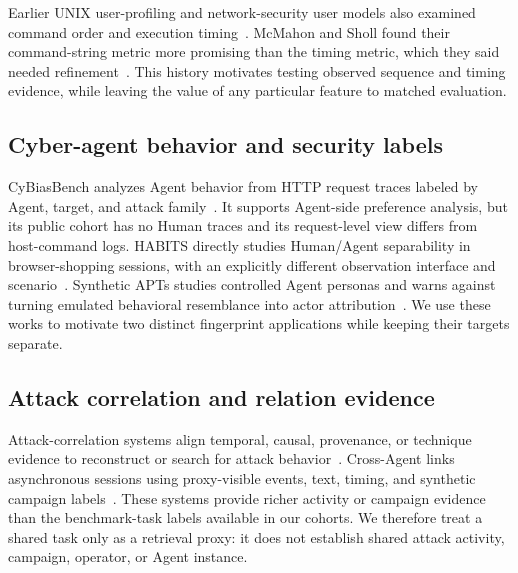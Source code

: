 \documentclass[10pt]{article}
\begin{document}
Earlier UNIX user-profiling and network-security user models also examined command order and execution timing~\cite{dao,mcmahon}. McMahon and Sholl found their command-string metric more promising than the timing metric, which they said needed refinement~\cite{mcmahon}. This history motivates testing observed sequence and timing evidence, while leaving the value of any particular feature to matched evaluation.

\subsection{Cyber-agent behavior and security labels}
CyBiasBench analyzes Agent behavior from HTTP request traces labeled by Agent, target, and attack family~\cite{cybias}. It supports Agent-side preference analysis, but its public cohort has no Human traces and its request-level view differs from host-command logs. HABITS directly studies Human/Agent separability in browser-shopping sessions, with an explicitly different observation interface and scenario~\cite{habits}. Synthetic APTs studies controlled Agent personas and warns against turning emulated behavioral resemblance into actor attribution~\cite{syntheticapt}. We use these works to motivate two distinct fingerprint applications while keeping their targets separate.

\subsection{Attack correlation and relation evidence}
Attack-correlation systems align temporal, causal, provenance, or technique evidence to reconstruct or search for attack behavior~\cite{holmes,poirot,atlas,ostinato,sfm}. Cross-Agent links asynchronous sessions using proxy-visible events, text, timing, and synthetic campaign labels~\cite{crossagent}. These systems provide richer activity or campaign evidence than the benchmark-task labels available in our cohorts. We therefore treat a shared task only as a retrieval proxy: it does not establish shared attack activity, campaign, operator, or Agent instance.
\end{document}
